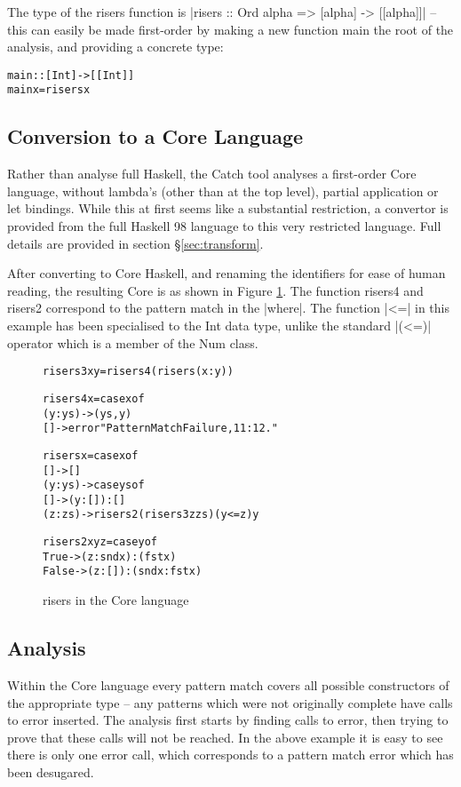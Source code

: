 \documentclass[preprint]{sigplanconf}
\newcommand{\C}[1]{\textsf{#1}}
\newenvironment{code}{\begin{alltt}\small}{\end{alltt}}
\begin{document}
The type of the \C{risers} function is |risers :: Ord alpha => [alpha] -> [[alpha]]| -- this can easily be made first-order by making a new function \C{main} the root of the analysis, and providing a concrete type:

\begin{code}
main :: [Int] -> [[Int]]
main x = risers x
\end{code}

\subsection{Conversion to a Core Language}

Rather than analyse full Haskell, the Catch tool analyses a first-order Core language, without lambda's (other than at the top level), partial application or let bindings. While this at first seems like a substantial restriction, a convertor is provided from the full Haskell 98 language to this very restricted language. Full details are provided in section \S\ref{sec:transform}.

After converting to Core Haskell, and renaming the identifiers for ease of human reading, the resulting Core is as shown in Figure \ref{fig:risers_core}. The function \C{risers4} and \C{risers2} correspond to the pattern match in the |where|. The function |<=| in this example has been specialised to the Int data type, unlike the standard |(<=)| operator which is a member of the \C{Num} class.

\begin{figure}
\begin{code}
risers3 x y = risers4 (risers (x : y))

risers4 x = case x of
    (y:ys) -> (ys, y)
    [] -> error "Pattern Match Failure, 11:12."

risers x = case x of
    [] -> []
    (y:ys) ->  case ys of
         [] -> (y : []) : []
         (z:zs) -> risers2 (risers3 z zs) (y <= z) y

risers2 x y z =  case y of
    True -> (z : snd x) : (fst x)
    False -> (z : []) : (snd x : fst x)
\end{code}
\caption{\C{risers} in the Core language}
\label{fig:risers_core}
\end{figure}

\subsection{Analysis}

Within the Core language every pattern match covers all possible constructors of the appropriate type -- any patterns which were not originally complete have calls to \C{error} inserted. The analysis first starts by finding calls to \C{error}, then trying to prove that these calls will not be reached. In the above example it is easy to see there is only one \C{error} call, which corresponds to a pattern match error which has been desugared.
\end{document}
